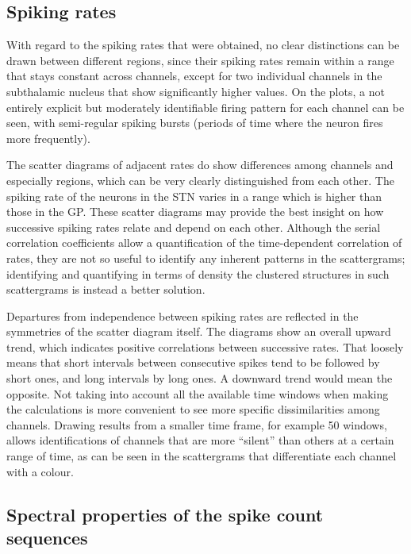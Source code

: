 \documentclass{kththesis}
\begin{document}
\subsection{Spiking rates}

With regard to the spiking rates that were obtained, no clear distinctions can be drawn between different regions, since their spiking rates remain within a range that stays constant across channels, except for two individual channels in the subthalamic nucleus that show significantly higher values. 
On the plots, a not entirely explicit but moderately identifiable firing pattern for each channel can be seen, with semi-regular spiking bursts (periods of time where the neuron fires more frequently). 

The scatter diagrams of adjacent rates do show differences among channels and especially regions, which can be very clearly distinguished from each other. 
The spiking rate of the neurons in the STN varies in a range which is higher than those in the GP. 
These scatter diagrams may provide the best insight on how successive spiking rates relate and depend on each other. 
Although the serial correlation coefficients allow a quantification of the time-dependent correlation of rates, they are not so useful to identify any inherent patterns in the scattergrams; identifying and quantifying in terms of density the clustered structures in such scattergrams is instead a better solution. 

Departures from independence between spiking rates are reflected in the symmetries of the scatter diagram itself. 
The diagrams show an overall upward trend, which indicates positive correlations between successive rates. 
That loosely means that short intervals between consecutive spikes tend to be followed by short ones, and long intervals by long ones. 
A downward trend would mean the opposite.
Not taking into account all the available time windows when making the calculations is more convenient to see more specific dissimilarities among channels. 
Drawing results from a smaller time frame, for example 50 windows, allows identifications of channels that are more “silent” than others at a certain range of time, as can be seen in the scattergrams that differentiate each channel with a colour. 

\subsection{Spectral properties of the spike count sequences}
\end{document}
